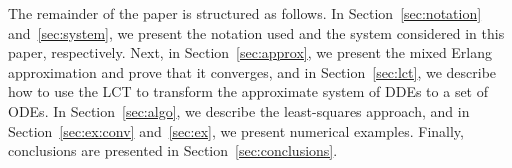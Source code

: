 The remainder of the paper is structured as follows. In Section~\ref{sec:notation} and~\ref{sec:system}, we present the notation used and the system considered in this paper, respectively. Next, in Section~\ref{sec:approx}, we present the mixed Erlang approximation and prove that it converges, and in Section~\ref{sec:lct}, we describe how to use the LCT to transform the approximate system of DDEs to a set of ODEs. In Section~\ref{sec:algo}, we describe the least-squares approach, and in Section~\ref{sec:ex:conv} and~\ref{sec:ex}, we present numerical examples. Finally, conclusions are presented in Section~\ref{sec:conclusions}.
